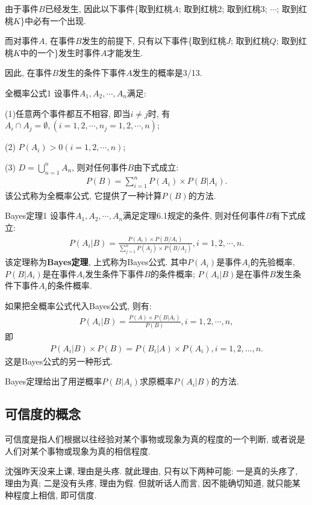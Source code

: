 \begin{result}
由于事件$B$已经发生, 因此以下事件\{取到红桃$A$; 取到红桃2; 取到红桃3; $\cdots$; 取到红桃$K$\}中必有一个出现.

而对事件$A$, 在事件$B$发生的前提下, 只有以下事件\{取到红桃$J$; 取到红桃$Q$; 取到红桃$K$中的一个\}发生时事件$A$才能发生.

因此, 在事件$B$发生的条件下事件$A$发生的概率是3/13.
\end{result}
\begin{mythm}{全概率公式}{1}
设事件$A_1,A_2,\cdots,A_n$满足:

    (1)任意两个事件都互不相容, 即当$i\neq j$时, 有$A_i\cap A_j=\emptyset, (i=1,2,\cdots ,n_j=1,2,\cdots ,n)$;

    (2) $P(A_i)>0 (i=1, 2, \cdots, n)$;

    (3) $D=\bigcup_{n=1}^{n} A_{n}$, 则对任何事件$B$由下式成立:
\begin{align}
  P(B)=\sum_{i=1}^{n} P\left(A_{i}\right) \times P\left(B | A_{i}\right).
\end{align}
该公式称为全概率公式, 它提供了一种计算$P(B)$的方法.
\end{mythm}
\begin{mythm}{Bayes定理}{1}
设事件$A_1,A_2,\cdots,A_n$满足定理6.1规定的条件, 则对任何事件$B$有下式成立:
\begin{align}
P\left(A_{i} | B\right)=\frac{P\left(A_{i}\right) \times P\left(B / A_{i}\right)}{\sum_{j=1}^{n} P\left(A_{j}\right) \times P\left(B / A_{j}\right)}, i=1,2, \cdots, n.
\end{align}
该定理称为\textbf{Bayes定理}, 上式称为Bayes公式. 其中$P(A_i)$是事件$A_i$的先验概率, $P(B|A_i)$是在事件$A_i$发生条件下事件$B$的条件概率; $P(A_i|B)$是在事件$B$发生条件下事件$A_i$的条件概率.
\end{mythm}

如果把全概率公式代入Bayes公式, 则有:
\begin{align}
  P\left(A_{i} | B\right)=\frac{P(A) \times P\left(B | A_{i}\right)}{P(B)}, i=1,2, \cdots, n,
\end{align}
即
\begin{align}
  P\left(A_{i} | B\right) \times P(B)=P\left(B_{i} | A\right) \times P\left(A_{i}\right), i=1,2, \ldots, n.
\end{align}
这是Bayes公式的另一种形式.

Bayes定理给出了用逆概率$P(B|A_i)$求原概率$P(A_i|B)$的方法.
\subsection{可信度的概念}
可信度是指人们根据以往经验对某个事物或现象为真的程度的一个判断, 或者说是人们对某个事物或现象为真的相信程度.
\begin{example}
  沈强昨天没来上课, 理由是头疼. 就此理由, 只有以下两种可能: 一是真的头疼了, 理由为真; 二是没有头疼, 理由为假. 但就听话人而言, 因不能确切知道, 就只能某种程度上相信, 即可信度.
\end{example}


